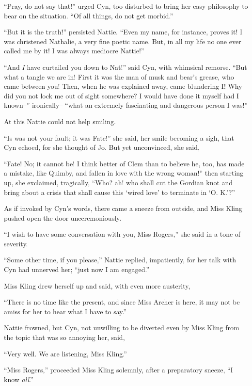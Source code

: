 ``Pray, do not say that!'' urged Cyn, too disturbed to bring her easy
philosophy to bear on the situation. ``Of all things, do not get morbid.''

``But it is the truth!'' persisted Nattie. ``Even my name, for instance,
proves it! I was christened Nathalie, a very fine poetic name. But, in
all my life no one ever called me by it! I was always mediocre Nattie!''

``And \emph{I} have curtailed you down to Nat!'' said Cyn, with whimsical
remorse. ``But what a tangle we are in! First it was the man of musk and
bear's grease, who came between you! Then, when he was explained away,
came blundering I! Why did you not lock me out of sight somewhere? I
would have done it myself had I known--'' ironically-- ``what an
extremely fascinating and dangerous person I was!''

At this Nattie could not help smiling.

``Is was not your fault; it was Fate!'' she said, her smile becoming a
sigh, that Cyn echoed, for she thought of Jo. But yet unconvinced, she
said,

``Fate! No; it cannot be! I think better of Clem than to believe he, too,
has made a mistake, like Quimby, and fallen in love with the wrong
woman!'' then starting up, she exclaimed, tragically, ``Who? ah! who
shall cut the Gordian knot and bring about a crisis that shall cause
this `wired love' to terminate in `O. K.'?''

As if invoked by Cyn's words, there came a sneeze from outside, and Miss
Kling pushed open the door unceremoniously.

``I wish to have some conversation with you, Miss Rogers,'' she said in a
tone of severity.

``Some other time, if you please,'' Nattie replied, impatiently, for her
talk with Cyn had unnerved her; ``just now I am engaged.''

Miss Kling drew herself up and said, with even more austerity,

``There is no time like the present, and since Miss Archer is here, it
may not be amiss for her to hear what I have to say.''

Nattie frowned, but Cyn, not unwilling to be diverted even by Miss Kling
from the topic that was so annoying her, said,

``Very well. We are listening, Miss Kling.''

``Miss Rogers,'' proceeded Miss Kling solemnly, after a preparatory
sneeze, ``I know \emph{all}.''

